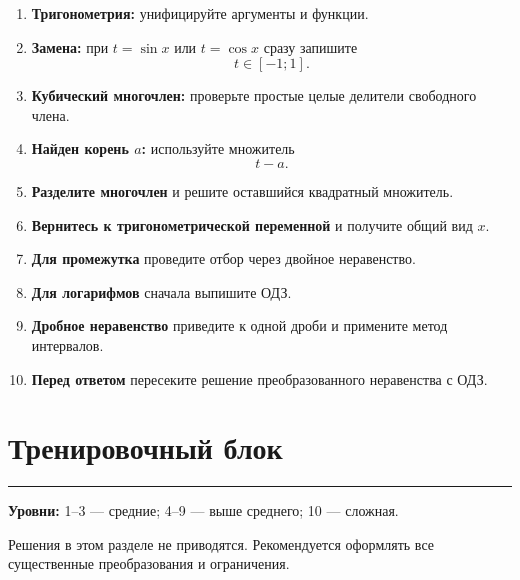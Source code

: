 \documentclass[a4paper,12pt]{article}
\newcommand{\sectionline}{%
    \vspace{0.2em}
    \noindent\color{linegray}\rule{\linewidth}{0.6pt}
    \vspace{0.4em}
}
\begin{document}
\begin{enumerate}
    \item \textbf{Тригонометрия:}
    унифицируйте аргументы и функции.

    \item \textbf{Замена:}
    при \(t=\sin x\) или \(t=\cos x\) сразу запишите
    \[
    t\in[-1;1].
    \]

    \item \textbf{Кубический многочлен:}
    проверьте простые целые делители свободного члена.

    \item \textbf{Найден корень \(a\):}
    используйте множитель
    \[
    t-a.
    \]

    \item \textbf{Разделите многочлен}
    и решите оставшийся квадратный множитель.

    \item \textbf{Вернитесь к тригонометрической переменной}
    и получите общий вид \(x\).

    \item \textbf{Для промежутка}
    проведите отбор через двойное неравенство.

    \item \textbf{Для логарифмов}
    сначала выпишите ОДЗ.

    \item \textbf{Дробное неравенство}
    приведите к одной дроби и примените метод интервалов.

    \item \textbf{Перед ответом}
    пересеките решение преобразованного неравенства с ОДЗ.
\end{enumerate}

\clearpage

\section*{\color{darkaccent}Тренировочный блок}
\sectionline

\textbf{Уровни:} 1--3 --- средние; 4--9 --- выше среднего; 10 --- сложная.

Решения в этом разделе не приводятся. Рекомендуется оформлять все существенные преобразования и ограничения.
\end{document}
